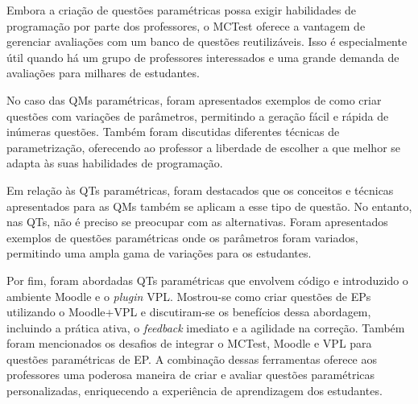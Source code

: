 Embora a criação de questões paramétricas possa exigir habilidades de programação por parte dos professores, o MCTest oferece a vantagem de gerenciar avaliações com um banco de questões reutilizáveis. Isso é especialmente útil quando há um grupo de professores interessados e uma grande demanda de avaliações para milhares de estudantes. 

No caso das QMs paramétricas, foram apresentados exemplos de como criar questões com variações de parâmetros, permitindo a geração fácil e rápida de inúmeras questões. Também foram discutidas diferentes técnicas de parametrização, oferecendo ao professor a liberdade de escolher a que melhor se adapta às suas habilidades de programação.

Em relação às QTs paramétricas, foram destacados que os conceitos e técnicas apresentados para as QMs também se aplicam a esse tipo de questão. No entanto, nas QTs, não é preciso se preocupar com as alternativas. Foram apresentados exemplos de questões paramétricas onde os parâmetros foram variados, permitindo uma ampla gama de variações para os estudantes.

Por fim, foram abordadas QTs paramétricas que envolvem código e introduzido o ambiente Moodle e o \textit{plugin} VPL. Mostrou-se como criar questões de EPs utilizando o Moodle+VPL e discutiram-se os benefícios dessa abordagem, incluindo a prática ativa, o \textit{feedback} imediato e a agilidade na correção. Também foram mencionados os desafios de integrar o MCTest, Moodle e VPL para questões paramétricas de EP. A combinação dessas ferramentas oferece aos professores uma poderosa maneira de criar e avaliar questões paramétricas personalizadas, enriquecendo a experiência de aprendizagem dos estudantes.